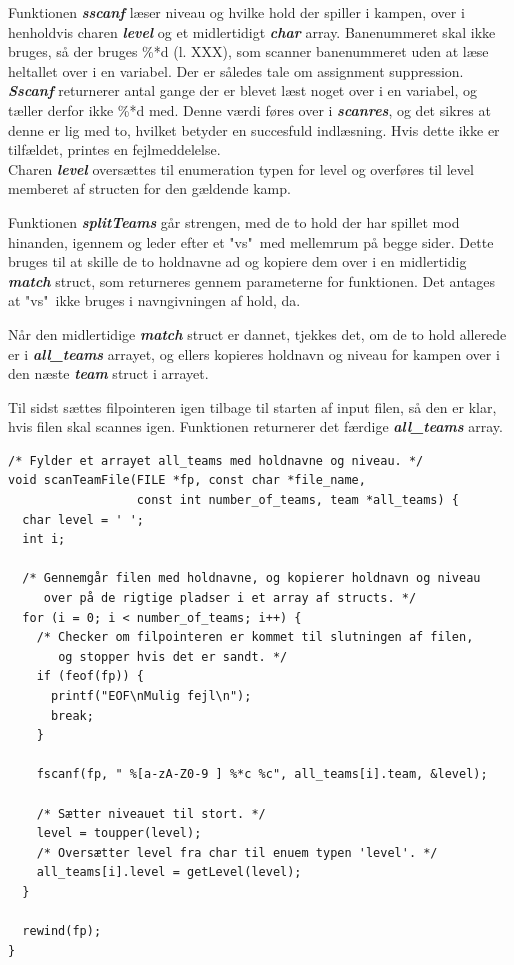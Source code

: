 \par
Funktionen \textbf{\textit{sscanf}} læser niveau og hvilke hold der spiller i kampen, over i henholdvis charen \textbf{\textit{level}} og et midlertidigt \textbf{\textit{char}} array. Banenummeret skal ikke bruges, så der bruges \%*d (l. XXX), som scanner banenummeret uden at læse heltallet over i en variabel. Der er således tale om assignment suppression. \textbf{\textit{Sscanf}} returnerer antal gange der er blevet læst noget over i en variabel, og tæller derfor ikke \%*d med. Denne værdi føres over i \textbf{\textit{scanres}}, og det sikres at denne er lig med to, hvilket betyder en succesfuld indlæsning. Hvis dette ikke er tilfældet, printes en fejlmeddelelse. 
\\
Charen \textbf{\textit{level}} oversættes til enumeration typen for level og overføres til level memberet af structen for den gældende kamp.
\par
Funktionen \textbf{\textit{splitTeams}} går strengen, med de to hold der har spillet mod hinanden, igennem og leder efter et "vs"\ med mellemrum på begge sider. Dette bruges til at skille de to holdnavne ad og kopiere dem over i en midlertidig \textbf{\textit{match}} struct, som returneres gennem parameterne for funktionen. Det antages at "vs"\ ikke bruges i navngivningen af hold, da.
\par
Når den midlertidige \textbf{\textit{match}} struct er dannet, tjekkes det, om de to hold allerede er i \textbf{\textit{all\_teams}} arrayet, og ellers kopieres holdnavn og niveau for kampen over i den næste \textbf{\textit{team}} struct i arrayet. 
\par
Til sidst sættes filpointeren igen tilbage til starten af input filen, så den er klar, hvis filen skal scannes igen. Funktionen returnerer det færdige \textbf{\textit{all\_teams}} array.

\begin{listing}[H]
\begin{verbatim}
/* Fylder et arrayet all_teams med holdnavne og niveau. */
void scanTeamFile(FILE *fp, const char *file_name, 
                  const int number_of_teams, team *all_teams) {
  char level = ' ';
  int i;

  /* Gennemgår filen med holdnavne, og kopierer holdnavn og niveau 
     over på de rigtige pladser i et array af structs. */
  for (i = 0; i < number_of_teams; i++) {
    /* Checker om filpointeren er kommet til slutningen af filen,
       og stopper hvis det er sandt. */
    if (feof(fp)) {
      printf("EOF\nMulig fejl\n");
      break;
    }

    fscanf(fp, " %[a-zA-Z0-9 ] %*c %c", all_teams[i].team, &level);

    /* Sætter niveauet til stort. */
    level = toupper(level);
    /* Oversætter level fra char til enuem typen 'level'. */
    all_teams[i].level = getLevel(level);
  }

  rewind(fp);
}
\end{verbatim}
\label{code:scanTeamFile}
\end{listing}

